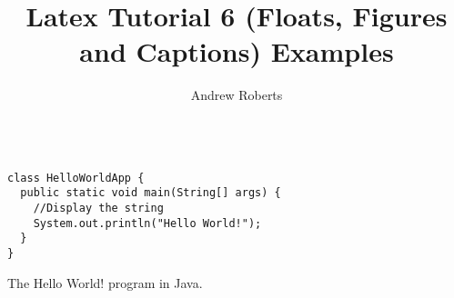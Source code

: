 \documentclass[english]{article}
\begin{document}
\title{Latex Tutorial 6 (Floats, Figures and Captions) Examples}
\author{Andrew Roberts}
\maketitle

\begin{program}
  \begin{verbatim}

class HelloWorldApp {
  public static void main(String[] args) {
    //Display the string
    System.out.println("Hello World!");
  }
}
\end{verbatim}
  \caption{The Hello World! program in Java.}
\end{program}
\end{document}
